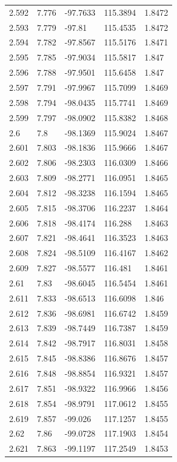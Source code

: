 \begin{tabular}{lllll}
2.592 & 7.776 & -97.7633 & 115.3894 & 1.8472 \\
2.593 & 7.779 & -97.81 & 115.4535 & 1.8472 \\
2.594 & 7.782 & -97.8567 & 115.5176 & 1.8471 \\
2.595 & 7.785 & -97.9034 & 115.5817 & 1.847 \\
2.596 & 7.788 & -97.9501 & 115.6458 & 1.847 \\
2.597 & 7.791 & -97.9967 & 115.7099 & 1.8469 \\
2.598 & 7.794 & -98.0435 & 115.7741 & 1.8469 \\
2.599 & 7.797 & -98.0902 & 115.8382 & 1.8468 \\
2.6 & 7.8 & -98.1369 & 115.9024 & 1.8467 \\
2.601 & 7.803 & -98.1836 & 115.9666 & 1.8467 \\
2.602 & 7.806 & -98.2303 & 116.0309 & 1.8466 \\
2.603 & 7.809 & -98.2771 & 116.0951 & 1.8465 \\
2.604 & 7.812 & -98.3238 & 116.1594 & 1.8465 \\
2.605 & 7.815 & -98.3706 & 116.2237 & 1.8464 \\
2.606 & 7.818 & -98.4174 & 116.288 & 1.8463 \\
2.607 & 7.821 & -98.4641 & 116.3523 & 1.8463 \\
2.608 & 7.824 & -98.5109 & 116.4167 & 1.8462 \\
2.609 & 7.827 & -98.5577 & 116.481 & 1.8461 \\
2.61 & 7.83 & -98.6045 & 116.5454 & 1.8461 \\
2.611 & 7.833 & -98.6513 & 116.6098 & 1.846 \\
2.612 & 7.836 & -98.6981 & 116.6742 & 1.8459 \\
2.613 & 7.839 & -98.7449 & 116.7387 & 1.8459 \\
2.614 & 7.842 & -98.7917 & 116.8031 & 1.8458 \\
2.615 & 7.845 & -98.8386 & 116.8676 & 1.8457 \\
2.616 & 7.848 & -98.8854 & 116.9321 & 1.8457 \\
2.617 & 7.851 & -98.9322 & 116.9966 & 1.8456 \\
2.618 & 7.854 & -98.9791 & 117.0612 & 1.8455 \\
2.619 & 7.857 & -99.026 & 117.1257 & 1.8455 \\
2.62 & 7.86 & -99.0728 & 117.1903 & 1.8454 \\
2.621 & 7.863 & -99.1197 & 117.2549 & 1.8453 \\

\end{tabular}
